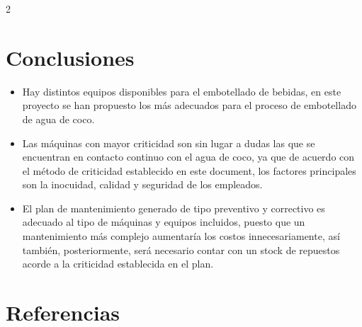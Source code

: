\documentclass[11pt,spanish,Letterpaper,openany]{book}
\begin{document}
\begin {multicols}{2}

\bigskip

\hypertarget{conclusiones-2}{%
\section{Conclusiones}\label{conclusiones-2}}

\begin{itemize}
\item
  Hay distintos equipos disponibles para el embotellado de bebidas, en este proyecto se han propuesto los más adecuados para el proceso de embotellado de agua de coco.
\item
  Las máquinas con mayor criticidad son sin lugar a dudas las que se encuentran en contacto continuo con el agua de coco, ya que de acuerdo con el método de criticidad establecido en este document, los factores principales son la inocuidad, calidad y seguridad de los empleados.
\item
  El plan de mantenimiento generado de tipo preventivo y correctivo es adecuado al tipo de máquinas y equipos incluidos, puesto que un mantenimiento más complejo aumentaría los costos innecesariamente, así también, posteriormente, será necesario contar con un stock de repuestos acorde a la criticidad establecida en el plan.
\end{itemize}

\hypertarget{referencias-2}{%
\section{Referencias}\label{referencias-2}}


\end{multicols}
\end{document}
